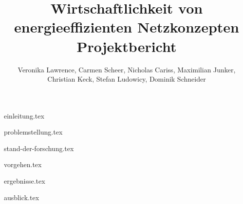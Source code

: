 \documentclass[
  12pt,
  titlepage,
  parskip,
  draft=false,
  headsepline=true,
  footsepline=true,
  captions=tableheading
]{scrartcl}
\title{\huge{Wirtschaftlichkeit von energieeffizienten Netzkonzepten} \\ \large{Projektbericht}}
\author{Veronika Lawrence, Carmen Scheer, Nicholas Cariss, Maximilian Junker,\\ Christian Keck, Stefan Ludowicy, Dominik Schneider}
\begin{document}
\maketitle
\newpage
\tableofcontents{}
\newpage
\listoffigures
\listoftables
\newpage


\pagestyle{headings}
{einleitung.tex}

{problemstellung.tex}

{stand-der-forschung.tex}

{vorgehen.tex}

{ergebnisse.tex}

{ausblick.tex}

\newpage
\printbibliography[heading=bibintoc]
\end{document}
